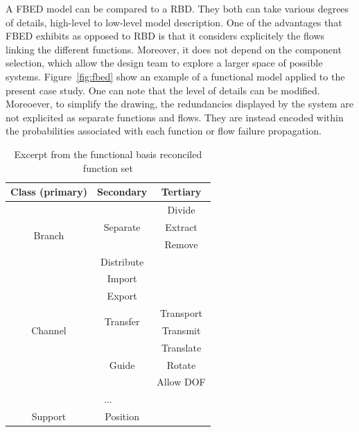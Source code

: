 A FBED model can be compared to a RBD. They both can take various degrees of details, high-level to low-level model description. One of the advantages that FBED exhibits as opposed to RBD is that it considers explicitely the flows linking the different functions. Moreover, it does not depend on the component selection, which allow the design team to explore a larger space of possible systems. Figure~\ref{fig:fbed} show an example of a functional model applied to the present case study. One can note that the level of details can be modified. Moreoever, to simplify the drawing, the redundancies displayed by the system are not explicited as separate functions and flows. They are instead encoded within the probabilities associated with each function or flow failure propagation.

\renewcommand{\arraystretch}{1.2}
\begin{table}[t] \small
\centering
\caption{Excerpt from the functional basis reconciled function set}
\label{tab:fbed_func}
\begin{tabular}{|c|c|c|}
\hline
Class (primary)          & Secondary                 & Tertiary  \\ \hline
\multirow{4}{*}{Branch}  & \multirow{3}{*}{Separate} & Divide    \\ \cline{3-3} 
                         &                           & Extract   \\ \cline{3-3} 
                         &                           & Remove    \\ \cline{2-3} 
                         & Distribute                &           \\ \hline
\multirow{7}{*}{Channel} & Import                    &           \\ \cline{2-3} 
                         & Export                    &           \\ \cline{2-3} 
                         & \multirow{2}{*}{Transfer} & Transport \\ \cline{3-3} 
                         &                           & Transmit  \\ \cline{2-3} 
                         & \multirow{3}{*}{Guide}    & Translate \\ \cline{3-3} 
                         &                           & Rotate    \\ \cline{3-3} 
                         &                           & Allow DOF \\ \hline
\multicolumn{3}{|c|}{...}                                        \\ \hline
Support & Position &           \\ \hline
\end{tabular}
\end{table}

